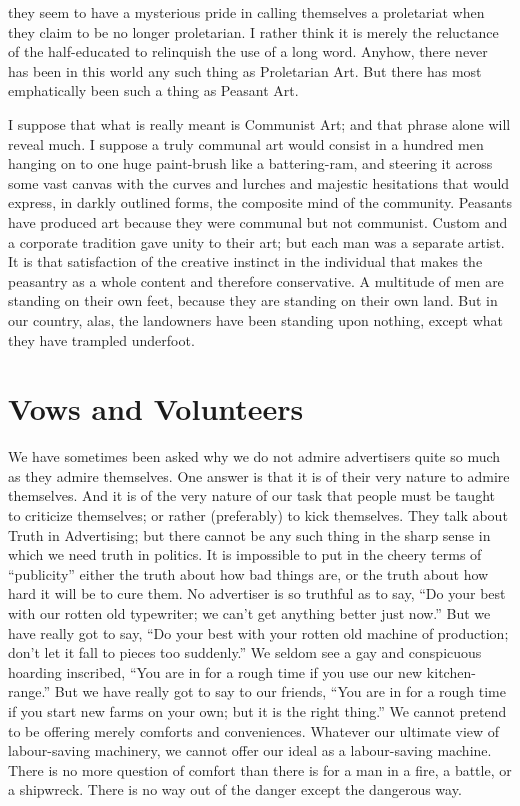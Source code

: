 \documentclass{book}
\begin{document}
they seem to have a mysterious pride in calling themselves a proletariat when they claim to be no longer proletarian. I rather think it is merely the reluctance of the half-educated to relinquish the use of a long word. Anyhow, there never has been in this world any such thing as Proletarian Art. But there has most emphatically been such a thing as Peasant Art.

I suppose that what is really meant is Communist Art; and that phrase alone will reveal much. I suppose a truly communal art would consist in a hundred men hanging on to one huge paint-brush like a battering-ram, and steering it across some vast canvas with the curves and lurches and majestic hesitations that would express, in darkly outlined forms, the composite mind of the community. Peasants have produced art because they were communal but not communist. Custom and a corporate tradition gave unity to their art; but each man was a separate artist. It is that satisfaction of the creative instinct in the individual that makes the peasantry as a whole content and therefore conservative. A multitude of men are standing on their own feet, because they are standing on their own land. But in our country, alas, the landowners have been standing upon nothing, except what they have trampled underfoot.

\chapter{Vows and Volunteers}
\label{chapter-12}
We have sometimes been asked why we do not admire advertisers quite so much as they admire themselves. One answer is that it is of their very nature to admire themselves. And it is of the very nature of our task that people must be taught to criticize themselves; or rather (preferably) to kick themselves. They talk about Truth in Advertising; but there cannot be any such thing in the sharp sense in which we need truth in politics. It is impossible to put in the cheery terms of “publicity” either the truth about how bad things are, or the truth about how hard it will be to cure them. No advertiser is so truthful as to say, “Do your best with our rotten old typewriter; we can’t get anything better just now.” But we have really got to say, “Do your best with your rotten old machine of production; don’t let it fall to pieces too suddenly.” We seldom see a gay and conspicuous hoarding inscribed, “You are in for a rough time if you use our new kitchen-range.” But we have really got to say to our friends, “You are in for a rough time if you start new farms on your own; but it is the right thing.” We cannot pretend to be offering merely comforts and conveniences. Whatever our ultimate view of labour-saving machinery, we cannot offer our ideal as a labour-saving machine. There is no more question of comfort than there is for a man in a fire, a battle, or a shipwreck. There is no way out of the danger except the dangerous way.
\end{document}
